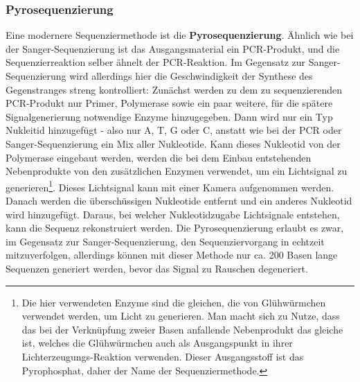 \subsubsection{Pyrosequenzierung}

Eine modernere Sequenziermethode ist die \textbf{Pyrosequenzierung}. Ähnlich wie bei der Sanger-Sequenzierung ist das Ausgangsmaterial ein PCR-Produkt, und die Sequenzierreaktion selber ähnelt der PCR-Reaktion. Im Gegensatz zur Sanger-Sequenzierung wird allerdings hier die Geschwindigkeit der Synthese des Gegenstranges streng kontrolliert: Zunächst werden zu dem zu sequenzierenden PCR-Produkt nur Primer, Polymerase sowie ein paar weitere, für die spätere Signalgenerierung notwendige Enzyme hinzugegeben. Dann wird nur ein Typ Nukleitid hinzugefügt - also nur A, T, G oder C, anstatt wie bei der PCR oder Sanger-Sequenzierung ein Mix aller Nukleotide. Kann dieses Nukleotid von der Polymerase eingebaut werden, werden die bei dem Einbau entstehenden Nebenprodukte von den zusätzlichen Enzymen verwendet, um ein Lichtsignal zu generieren\footnote{Die hier verwendeten Enzyme sind die gleichen, die von Glühwürmchen verwendet werden, um Licht zu generieren. Man macht sich zu Nutze, dass das bei der Verknüpfung zweier Basen anfallende Nebenprodukt das gleiche ist, welches die Glühwürmchen auch als Ausgangspunkt in ihrer Lichterzeugungs-Reaktion verwenden. Dieser Ausgangsstoff ist das Pyrophosphat, daher der Name der Sequenziermethode.}. Dieses Lichtsignal kann mit einer Kamera aufgenommen werden. Danach werden die überschüssigen Nukleotide entfernt und ein anderes Nukleotid wird hinzugefügt. Daraus, bei welcher Nukleotidzugabe Lichtsignale entstehen, kann die Sequenz rekonstruiert werden. Die Pyrosequenzierung erlaubt es zwar, im Gegensatz zur Sanger-Sequenzierung, den Sequenziervorgang in echtzeit mitzuverfolgen, allerdings können mit dieser Methode nur ca. 200 Basen lange Sequenzen generiert werden, bevor das Signal zu Rauschen degeneriert. 
